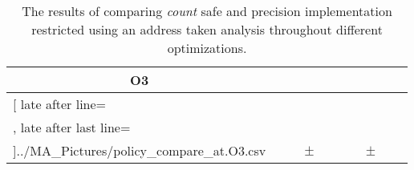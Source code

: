 \begin{table}[!htbp]
{\begin{tabular}{l|c|rcl|c|rcl|c}
\multicolumn{1}{c}{\bfseries O3}
	\\\midrule
	\csvreader[ late after line=\\, late after last line=\\\bottomrule]{../MA_Pictures/policy_compare_at.O3.csv}{
}
	{\csvcolii  &  \csvcoliii & \csvcoliv & $\pm$ & \csvcolv & \csvcolvi & \csvcolvii & $\pm$ & \csvcolviii& \csvcolix}%

    	\end{tabular}
}
		\caption {The results of comparing \textit{count} safe and precision implementation restricted using an address taken analysis throughout different optimizations.}
		\label{tbl:policycompatcount}
\end{table}

